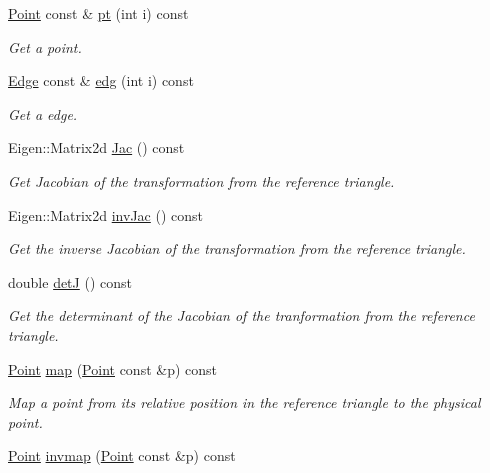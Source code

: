 \begin{DoxyCompactItemize}
\hyperlink{classTspeed_1_1Geo_1_1Point}{Point} const \& \hyperlink{classTspeed_1_1Geo_1_1Triangle_a6c4b1ba6d7adf584776089ecfc8d4f8e}{pt} (int i) const 
\begin{DoxyCompactList}\small\item\em Get a point. \end{DoxyCompactList}\item 
\hyperlink{classTspeed_1_1Geo_1_1Edge}{Edge} const \& \hyperlink{classTspeed_1_1Geo_1_1Triangle_aabfd53348c1c63905abf4eeda9cd42ae}{edg} (int i) const 
\begin{DoxyCompactList}\small\item\em Get a edge. \end{DoxyCompactList}\item 
Eigen\-::\-Matrix2d \hyperlink{classTspeed_1_1Geo_1_1Triangle_a936a5210cb5fdc598fa55a703b0d776d}{Jac} () const 
\begin{DoxyCompactList}\small\item\em Get Jacobian of the transformation from the reference triangle. \end{DoxyCompactList}\item 
Eigen\-::\-Matrix2d \hyperlink{classTspeed_1_1Geo_1_1Triangle_acadcc4f5328209374fa1060e42d564bb}{inv\-Jac} () const 
\begin{DoxyCompactList}\small\item\em Get the inverse Jacobian of the transformation from the reference triangle. \end{DoxyCompactList}\item 
double \hyperlink{classTspeed_1_1Geo_1_1Triangle_a2737a2218f6ecbf80e34e360fd2c0ccd}{det\-J} () const 
\begin{DoxyCompactList}\small\item\em Get the determinant of the Jacobian of the tranformation from the reference triangle. \end{DoxyCompactList}\item 
\hyperlink{classTspeed_1_1Geo_1_1Point}{Point} \hyperlink{classTspeed_1_1Geo_1_1Triangle_a3ae4d893a8a0b5612aa5530914fbe704}{map} (\hyperlink{classTspeed_1_1Geo_1_1Point}{Point} const \&p) const 
\begin{DoxyCompactList}\small\item\em Map a point from its relative position in the reference triangle to the physical point. \end{DoxyCompactList}\item 
\hyperlink{classTspeed_1_1Geo_1_1Point}{Point} \hyperlink{classTspeed_1_1Geo_1_1Triangle_aa607d5ba63bf021d0ca818c4727ff2c9}{invmap} (\hyperlink{classTspeed_1_1Geo_1_1Point}{Point} const \&p) const 

\end{DoxyCompactItemize}
